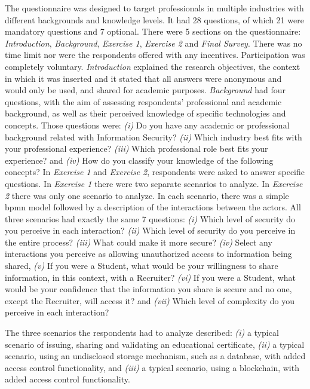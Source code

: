 The questionnaire was designed to target professionals in multiple industries with different backgrounds and knowledge levels. It had 28 questions, of which 21 were mandatory questions and 7 optional. There were 5 sections on the questionnaire: \textit{Introduction}, \textit{Background}, \textit{Exercise 1}, \textit{Exercise 2} and \textit{Final Survey}. There was no time limit nor were the respondents offered with any incentives. Participation was completely voluntary.
%
\textit{Introduction} explained the research objectives, the context in which it was inserted and it stated that all answers were anonymous and would only be used, and shared for academic purposes. 
%
\textit{Background} had four questions, with the aim of assessing respondents' professional and academic background, as well as their perceived knowledge of specific technologies and concepts. Those questions were:
%
\emph{(i)} Do you have any academic or professional background related with Information Security? 
\emph{(ii)} Which industry best fits with your professional experience? 
\emph{(iii)} Which professional role best fits your experience? 
and \emph{(iv)} How do you classify your knowledge of the following concepts?
%
In \textit{Exercise 1} and \textit{Exercise 2}, respondents were asked to answer specific questions. In \textit{Exercise 1} there were two separate scenarios to analyze. In \textit{Exercise 2} there was only one scenario to analyze. In each scenario, there was a simple \gls{bpmn} \cite{BPMN} model followed by a description of the interactions between the actors. All three scenarios had exactly the same 7 questions: 
%
\emph{(i)} Which level of security do you perceive in each interaction? 
\emph{(ii)} Which level of security do you perceive in the entire process? 
\emph{(iii)} What could make it more secure? 
\emph{(iv)} Select any interactions you perceive as allowing unauthorized access to information being shared, 
\emph{(v)} If you were a Student, what would be your willingness to share information, in this context, with a Recruiter? 
\emph{(vi)} If you were a Student, what would be your confidence that the information you share is secure and no one, except the Recruiter, will access it? 
and \emph{(vii)} Which level of complexity do you perceive in each interaction?

The three scenarios the respondents had to analyze described: 
\emph{(i)} a typical scenario of issuing, sharing and validating an educational certificate, \emph{(ii)} a typical scenario, using an undisclosed storage mechanism, such as a database, with added access control functionality, and \emph{(iii)} a typical scenario, using a blockchain, with added access control functionality.

